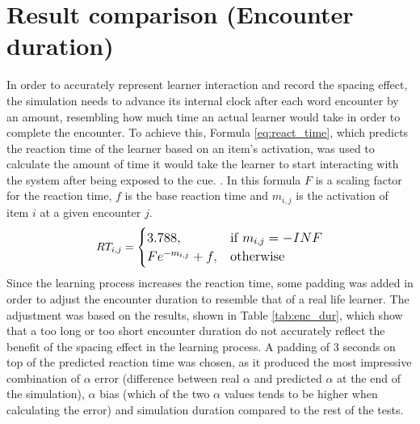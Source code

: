 \documentclass[a4paper]{report}
\begin{document}
\section{Result comparison (Encounter duration)}
In order to accurately represent learner interaction and record the spacing effect, the simulation needs to advance its internal clock after each word encounter by an amount, resembling how much time an actual learner would take in order to complete the encounter. To achieve this, Formula \ref{eq:react_time}, which predicts the reaction time of the learner based on an item's activation, was used to calculate the amount of time it would take the learner to start interacting with the system after being exposed to the cue. \cite{vans09}. In this formula $F$ is a scaling factor for the reaction time, $f$ is the base reaction time and $m_{i,j}$ is the activation of item $i$ at a given encounter $j$.
\begin{equation}
\begin{large}
\label{eq:react_time}
RT_{i,j} =  
\begin{cases}
    3.788, & \text{if } m_{i,j} = -INF \\
    Fe^{-m_{i,j}} + f,  & \text{otherwise}
\end{cases}
\end{large}
\end{equation}
Since the learning process increases the reaction time, some padding was added in order to adjust the encounter duration to resemble that of a real life learner. The adjustment was based on the results, shown in Table \ref{tab:enc_dur}, which show that a too long or too short encounter duration do not accurately reflect the benefit of the spacing effect in the learning process. A padding of 3 seconds on top of the predicted reaction time was chosen, as it produced the most impressive combination of $\alpha$ error (difference between real $\alpha$ and predicted $\alpha$ at the end of the simulation), $\alpha$ bias (which of the two $\alpha$ values tends to be higher when calculating the error) and simulation duration compared to the rest of the tests.
\end{document}

